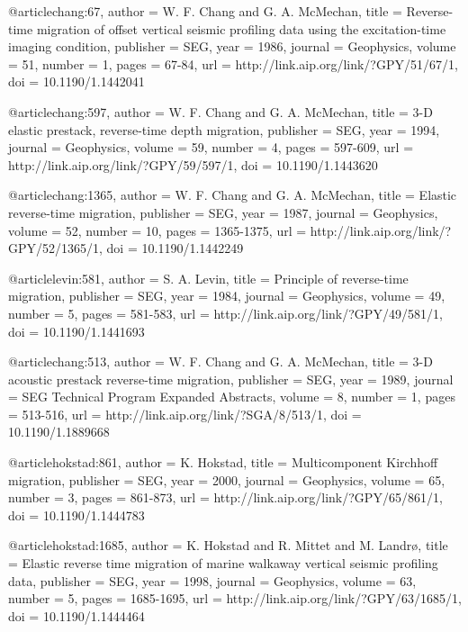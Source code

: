 {@article{chang:67,
  author =	 {W. F. Chang and G. A. McMechan},
  title =	 {Reverse-time migration of offset vertical seismic
                  profiling data using the excitation-time imaging
                  condition},
  publisher =	 {SEG},
  year =	 1986,
  journal =	 {Geophysics},
  volume =	 51,
  number =	 1,
  pages =	 {67-84},
  url =		 {http://link.aip.org/link/?GPY/51/67/1},
  doi =		 {10.1190/1.1442041}
}

@article{chang:597,
  author =	 {W. F. Chang and G. A. McMechan},
  title =	 {3-{D} elastic prestack, reverse-time depth
                  migration},
  publisher =	 {SEG},
  year =	 1994,
  journal =	 {Geophysics},
  volume =	 59,
  number =	 4,
  pages =	 {597-609},
  url =		 {http://link.aip.org/link/?GPY/59/597/1},
  doi =		 {10.1190/1.1443620}
}

@article{chang:1365,
  author =	 {W. F. Chang and G. A. McMechan},
  title =	 {Elastic reverse-time migration},
  publisher =	 {SEG},
  year =	 1987,
  journal =	 {Geophysics},
  volume =	 52,
  number =	 10,
  pages =	 {1365-1375},
  url =		 {http://link.aip.org/link/?GPY/52/1365/1},
  doi =		 {10.1190/1.1442249}
}

@article{levin:581,
  author =	 {S. A. Levin},
  title =	 {Principle of reverse-time migration},
  publisher =	 {SEG},
  year =	 1984,
  journal =	 {Geophysics},
  volume =	 49,
  number =	 5,
  pages =	 {581-583},
  url =		 {http://link.aip.org/link/?GPY/49/581/1},
  doi =		 {10.1190/1.1441693}
}

@article{chang:513,
  author =	 {W. F. Chang and G. A. McMechan},
  title =	 {3-{D} acoustic prestack reverse-time migration},
  publisher =	 {SEG},
  year =	 1989,
  journal =	 {SEG Technical Program Expanded Abstracts},
  volume =	 8,
  number =	 1,
  pages =	 {513-516},
  url =		 {http://link.aip.org/link/?SGA/8/513/1},
  doi =		 {10.1190/1.1889668}
}

@article{hokstad:861,
  author =	 {K. Hokstad},
  title =	 {Multicomponent {K}irchhoff migration},
  publisher =	 {SEG},
  year =	 2000,
  journal =	 {Geophysics},
  volume =	 65,
  number =	 3,
  pages =	 {861-873},
  url =		 {http://link.aip.org/link/?GPY/65/861/1},
  doi =		 {10.1190/1.1444783}
}

@article{hokstad:1685,
  author =	 {K. Hokstad and R. Mittet and M. Landr\o},
  title =	 {Elastic reverse time migration of marine walkaway
                  vertical seismic profiling data},
  publisher =	 {SEG},
  year =	 1998,
  journal =	 {Geophysics},
  volume =	 63,
  number =	 5,
  pages =	 {1685-1695},
  url =		 {http://link.aip.org/link/?GPY/63/1685/1},
  doi =		 {10.1190/1.1444464}
}

}
